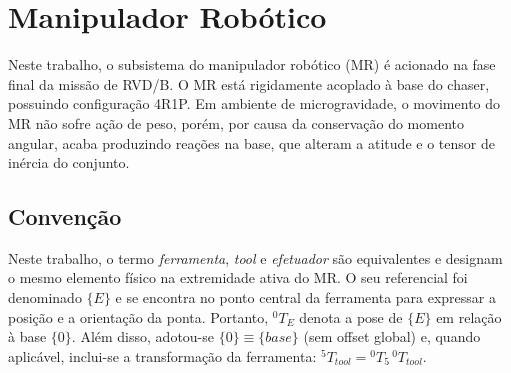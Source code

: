 \section{Manipulador Robótico}
Neste trabalho, o subsistema do manipulador robótico (MR) é acionado na fase final da missão de RVD/B.
O MR está rigidamente acoplado à base do chaser, possuindo  configuração 4R1P.
Em ambiente de microgravidade, o movimento do MR não sofre ação de peso, porém, por causa da conservação do momento angular, acaba produzindo reações na base, que alteram a atitude e o tensor de inércia do conjunto.


\subsection{Convenção}
Neste trabalho, o termo \emph{ferramenta}, \emph{tool} e \emph{efetuador} são equivalentes e designam o mesmo elemento físico na extremidade ativa do MR.
O seu referencial foi denominado $\{E\}$ e se encontra no ponto central da ferramenta para expressar a posição e a orientação da ponta.
Portanto, ${}^{0}T_{E}$ denota a pose de
$\{E\}$ em relação à base $\{0\}$.
Além disso, adotou-se $\{0\}\equiv\{base\}$ (sem offset global) e,
quando aplicável, inclui-se a transformação da ferramenta:
${}^5 T_{tool} = {}^0 T_{5}\,{}^0 T_{tool}$.





